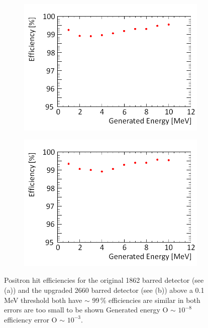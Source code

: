 \begin{figure}[!h]
\centering
\begin{subfigure}{.5\textwidth}
  \centering
  \includegraphics[width=\linewidth]{Chapter4/Figs/Raster/year1Plots/2000_1-10MeV_sec_p_spread_run_medText.png}
  \captionsetup{width=.9\linewidth}
  \caption{}
  \label{subFig:2000_p_sec}
\end{subfigure}%
\begin{subfigure}{.5\textwidth}
  \centering
  \includegraphics[width=\linewidth]{Chapter4/Figs/Raster/year1Plots/3000_1-10MeV_sec_p_spread_run_medText.png}
  \captionsetup{width=.9\linewidth}
  \caption{}
  \label{subFig:3000_p_sec}
\end{subfigure}
\caption{Positron hit efficiencies for the original 1862 barred detector (see (a)) and the upgraded 2660 barred detector (see (b)) above a 0.1\,MeV threshold both have $\sim$ 99\,\% efficiencies are similar in both errors are too small to be shown Generated energy O $\sim$ $10^{-8}$ efficiency error O $\sim$ $10^{-3}$. }
\label{fig:2000_3000_p_secs}
\end{figure}

